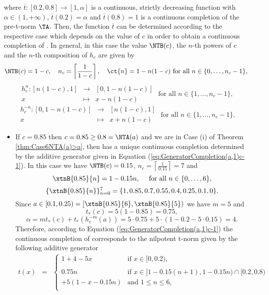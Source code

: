 \begin{example}
\begin{itemize}
		where $\overline{t}:[0.2,0.8] \to [1,\alpha]$ is a continuous, strictly decreasing function with $\alpha \in (1,+\infty)$, $\overline{t}(0.2)=\alpha$ and $\overline{t}(0.8)=1$ is a continuous completion of the pre-t-norm $\TA$. Then, the function $\overline{t}$ can be determined according to the respective case which depends on the value of $c$ in order to obtain a continuous completion of \TB. In general, in this case the value $\NTB(c)$, the $n$-th powers of $c$ and the $n$-th composition of $h_c$ are given by
		$$\NTB(c)=1-c, \quad n_c = \left \lceil{\frac{1}{1-c}}\right \rceil, \quad \ct{n}=1-n(1-c) \text{ for all } n \in \{0,\dots,n_c-1\},$$
		$$
		\begin{array}{rcl}
			h_c^n:[n(1-c),1]&\longrightarrow&[0,1-n(1-c)]\\
			x&\longmapsto& x-n(1-c)
		\end{array}
		\text{ for all } n \in \{1,\dots,n_c-1\},
		$$
		$$
		\begin{array}{rcl}
			h_c^{-n}:[0,1-n(1-c)]&\longrightarrow&[n(1-c),1]\\
			x&\longmapsto& x+n(1-c)
		\end{array}
		\text{ for all } n \in \{1,\dots,n_c-1\}.
		$$
		\begin{itemize}
			\item If $c=0.85$ then $c=0.85\geq 0.8=\NTA(a)$ and we are in Case (i) of Theorem \ref{thm:Case6NTA(a)>a}, then \TB has a unique continuous completion determined by the additive generator given in Equation (\ref{eq:GeneratorCompletion(a,1)c-1}). In this case we have $\NTB(c)=0.15$, $n_c = \left \lceil{\frac{1}{0.15}}\right \rceil = 7$ and
			$$\xtnB{0.85}{n}=1-0.15n, \quad \text{ for all } n \in \{0,\dots,6\},$$ 
			$$\{\xtnB{0.85}{n}\}_{n=0}^7 = \{1,0.85,0.7,0.55,0.4,0.25,0.1,0\}.$$
			Since $a \in [0.1,0.25)=[\xtnB{0.85}{6},\xtnB{0.85}{5})$ we have $m=5$ and
			$$t_*(c)=5(1-0.85)=0.75,$$ 
			$$\alpha = mt_*(c)+t_*(h_c^{-m}(a)) = 5 \cdot 0.75 + 5 \cdot (1-0.2-5\cdot 0.15)=4.$$
			Therefore, according to Equation (\ref{eq:GeneratorCompletion(a,1)c-1}) the continuous completion of \TB corresponds to the nilpotent t-norm given by the following additive generator
			\begin{eqnarray*}
				t(x)
				&=&
				\left\{ \begin{array}{ll}
					1+4-5x & \text{if } x \in [0,0.2), \\
					& \\
					0.75n & \text{if } x \in [1-0.15(n+1),1-0.15n) \cap [0.2,0.8) \\
					+5(1-x-0.15n) & \text{and } 1 \leq n \leq 6, \\

\end{array}
\end{eqnarray*}
\end{itemize}
\end{itemize}
\end{example}
